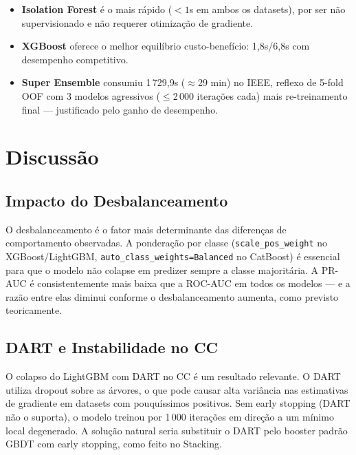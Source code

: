 \documentclass[12pt,a4paper]{article}
\begin{document}
\begin{itemize}[nosep]
  \item \textbf{Isolation Forest} é o mais rápido ($<1$s em ambos os datasets),
    por ser não supervisionado e não requerer otimização de gradiente.
  \item \textbf{XGBoost} oferece o melhor equilíbrio custo-benefício:
    1{,}8s/6{,}8s com desempenho competitivo.
  \item \textbf{Super Ensemble} consumiu 1\,729{,}9s ($\approx$29 min) no IEEE,
    reflexo de 5-fold OOF com 3 modelos agressivos ($\leq$2\,000 iterações cada)
    mais re-treinamento final — justificado pelo ganho de desempenho.
\end{itemize}

\section{Discussão}
\label{sec:discussao}

\subsection{Impacto do Desbalanceamento}

O desbalanceamento é o fator mais determinante das diferenças de comportamento
observadas. A ponderação por classe (\texttt{scale\_pos\_weight} no XGBoost/LightGBM,
\texttt{auto\_class\_weights=Balanced} no CatBoost) é essencial para que o
modelo não colapse em predizer sempre a classe majoritária. A PR-AUC é
consistentemente mais baixa que a ROC-AUC em todos os modelos — e a razão entre
elas diminui conforme o desbalanceamento aumenta, como previsto teoricamente.

\subsection{DART e Instabilidade no CC}

O colapso do LightGBM com DART no CC é um resultado relevante. O DART utiliza
dropout sobre as árvores, o que pode causar alta variância nas estimativas de
gradiente em datasets com pouquíssimos positivos. Sem early stopping (DART não
o suporta), o modelo treinou por 1\,000 iterações em direção a um mínimo local
degenerado. A solução natural seria substituir o DART pelo booster padrão GBDT
com early stopping, como feito no Stacking.
\end{document}
